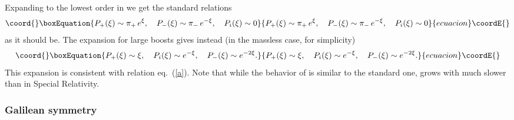 \documentclass [12pt]  {article}
\begin{document}
Expanding to the lowest order in \myHighlight{$\kappa$}\coordHE{} we get the standard
relations
\begin{equation}\coord{}\boxEquation{\label{16}
P_+(\xi) \sim\pi_+ \, e^\xi, \quad P_-(\xi) \sim \pi_-\, e^{-\xi},
\quad P_i(\xi) \sim 0
}{P_+(\xi) \sim\pi_+ \, e^\xi, \quad P_-(\xi) \sim \pi_-\, e^{-\xi},
\quad P_i(\xi) \sim 0
}{ecuacion}\coordE{}\end{equation}
as it should be. The expansion for large boosts
\myHighlight{$\xi\rightarrow\infty$}\coordHE{} gives instead (in the massless case, for
simplicity)
\begin{equation}\coord{}\boxEquation{\label{17}
P_+(\xi) \sim  \xi ,
  \quad P_i(\xi)\sim
e^{-\xi},\quad P_-(\xi) \sim  e^{-2\xi}.
}{P_+(\xi) \sim  \xi ,
  \quad P_i(\xi)\sim
e^{-\xi},\quad P_-(\xi) \sim  e^{-2\xi}.
}{ecuacion}\coordE{}\end{equation}
This expansion is consistent with relation eq.~(\ref{a}). Note
that while the behavior of \coordHE{} is similar to the standard
one, \coordHE{} grows with \myHighlight{$\xi$}\coordHE{} much slower than in Special
Relativity.

\subsubsection*{Galilean symmetry}
\end{document}
